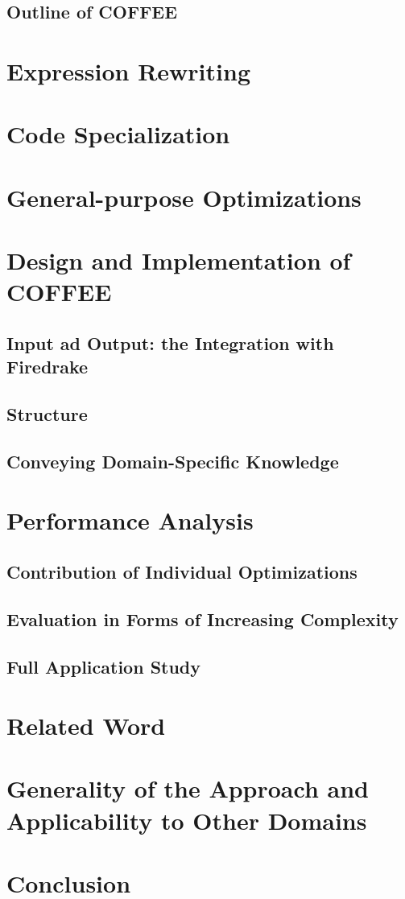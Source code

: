 \subsection{Outline of COFFEE}


\section{Expression Rewriting}

\section{Code Specialization}

\section{General-purpose Optimizations}

\section{Design and Implementation of COFFEE}
\label{sec:coffee-implementation}
\subsection{Input ad Output: the Integration with Firedrake}
\subsection{Structure}
\subsection{Conveying Domain-Specific Knowledge}

\section{Performance Analysis}
\subsection{Contribution of Individual Optimizations}
\subsection{Evaluation in Forms of Increasing Complexity}
\subsection{Full Application Study}


\section{Related Word}
\label{sec:coffee-related-work}

\section{Generality of the Approach and Applicability to Other Domains}
\label{sec:generality}

\section{Conclusion}